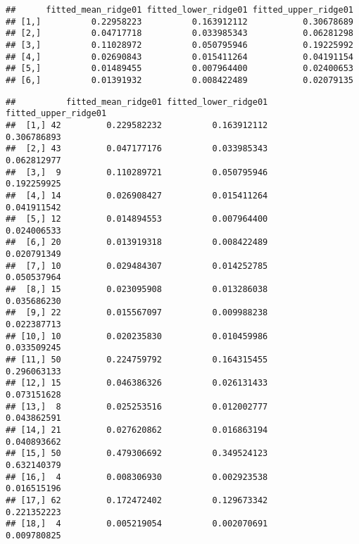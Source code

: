 \documentclass[]{article}
\newenvironment{Shaded}{\begin{snugshade}}{\end{snugshade}}
\newcommand{\CommentTok}[1]{\textcolor[rgb]{0.56,0.35,0.01}{\textit{#1}}}
\newcommand{\KeywordTok}[1]{\textcolor[rgb]{0.13,0.29,0.53}{\textbf{#1}}}
\newcommand{\NormalTok}[1]{#1}
\newcommand{\OperatorTok}[1]{\textcolor[rgb]{0.81,0.36,0.00}{\textbf{#1}}}
\begin{document}
\begin{verbatim}
##      fitted_mean_ridge01 fitted_lower_ridge01 fitted_upper_ridge01
## [1,]          0.22958223          0.163912112           0.30678689
## [2,]          0.04717718          0.033985343           0.06281298
## [3,]          0.11028972          0.050795946           0.19225992
## [4,]          0.02690843          0.015411264           0.04191154
## [5,]          0.01489455          0.007964400           0.02400653
## [6,]          0.01391932          0.008422489           0.02079135
\end{verbatim}

\begin{Shaded}
\end{Shaded}

\begin{verbatim}
##          fitted_mean_ridge01 fitted_lower_ridge01 fitted_upper_ridge01
##  [1,] 42         0.229582232          0.163912112          0.306786893
##  [2,] 43         0.047177176          0.033985343          0.062812977
##  [3,]  9         0.110289721          0.050795946          0.192259925
##  [4,] 14         0.026908427          0.015411264          0.041911542
##  [5,] 12         0.014894553          0.007964400          0.024006533
##  [6,] 20         0.013919318          0.008422489          0.020791349
##  [7,] 10         0.029484307          0.014252785          0.050537964
##  [8,] 15         0.023095908          0.013286038          0.035686230
##  [9,] 22         0.015567097          0.009988238          0.022387713
## [10,] 10         0.020235830          0.010459986          0.033509245
## [11,] 50         0.224759792          0.164315455          0.296063133
## [12,] 15         0.046386326          0.026131433          0.073151628
## [13,]  8         0.025253516          0.012002777          0.043862591
## [14,] 21         0.027620862          0.016863194          0.040893662
## [15,] 50         0.479306692          0.349524123          0.632140379
## [16,]  4         0.008306930          0.002923538          0.016515196
## [17,] 62         0.172472402          0.129673342          0.221352223
## [18,]  4         0.005219054          0.002070691          0.009780825
\end{verbatim}
\end{document}
